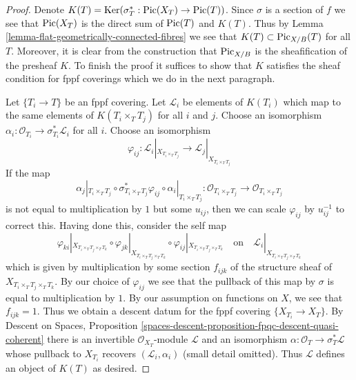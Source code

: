 \begin{proof}
Denote $K(T) = \mathop{\mathrm{Ker}}(\sigma_T^* : \mathop{\mathrm{Pic}}\nolimits(X_T) \to \mathop{\mathrm{Pic}}\nolimits(T))$.
Since $\sigma$ is a section of $f$ we see that $\mathop{\mathrm{Pic}}\nolimits(X_T)$ is the direct
sum of $\mathop{\mathrm{Pic}}\nolimits(T)$ and $K(T)$.
Thus by Lemma \ref{lemma-flat-geometrically-connected-fibres} we see that
$K(T) \subset \mathrm{Pic}_{X/B}(T)$ for all $T$. Moreover, it is clear
from the construction that $\mathrm{Pic}_{X/B}$ is the sheafification
of the presheaf $K$. To finish the proof it suffices to show that
$K$ satisfies the sheaf condition for fppf coverings which we do
in the next paragraph.

\medskip\noindent
Let $\{T_i \to T\}$ be an fppf covering. Let $\mathcal{L}_i$ be
elements of $K(T_i)$ which map to the same elements of $K(T_i \times_T T_j)$
for all $i$ and $j$. Choose an isomorphism
$\alpha_i : \mathcal{O}_{T_i} \to \sigma_{T_i}^*\mathcal{L}_i$
for all $i$. Choose an isomorphism
$$
\varphi_{ij} :
\mathcal{L}_i|_{X_{T_i \times_T T_j}}
\longrightarrow
\mathcal{L}_j|_{X_{T_i \times_T T_j}}
$$
If the map
$$
\alpha_j|_{T_i \times_T T_j} \circ
\sigma_{T_i \times_T T_j}^*\varphi_{ij} \circ
\alpha_i|_{T_i \times_T T_j} :
\mathcal{O}_{T_i \times_T T_j} \to \mathcal{O}_{T_i \times_T T_j}
$$
is not equal to multiplication by $1$ but some $u_{ij}$, then we can scale
$\varphi_{ij}$ by $u_{ij}^{-1}$ to correct this. Having done this, consider
the self map
$$
\varphi_{ki}|_{X_{T_i \times_T T_j \times_T T_k}} \circ
\varphi_{jk}|_{X_{T_i \times_T T_j \times_T T_k}} \circ
\varphi_{ij}|_{X_{T_i \times_T T_j \times_T T_k}}
\quad\text{on}\quad
\mathcal{L}_i|_{X_{T_i \times_T T_j \times_T T_k}}
$$
which is given by multiplication by some section $f_{ijk}$
of the structure sheaf of $X_{T_i \times_T T_j \times_T T_k}$.
By our choice of $\varphi_{ij}$ we see that the pullback of
this map by $\sigma$ is equal to multiplication by $1$. By
our assumption on functions on $X$, we see that $f_{ijk} = 1$.
Thus we obtain a descent datum for the fppf covering
$\{X_{T_i} \to X_T\}$. By
Descent on Spaces, Proposition
\ref{spaces-descent-proposition-fpqc-descent-quasi-coherent}
there is an invertible $\mathcal{O}_{X_T}$-module $\mathcal{L}$
and an isomorphism $\alpha : \mathcal{O}_T \to \sigma_T^*\mathcal{L}$
whose pullback to $X_{T_i}$ recovers $(\mathcal{L}_i, \alpha_i)$
(small detail omitted). Thus $\mathcal{L}$ defines an object
of $K(T)$ as desired.
\end{proof}

